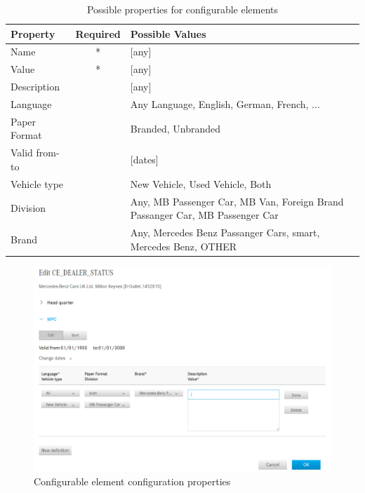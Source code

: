 \begin{table}[!ht]
  \begin{center}
    \begin{tabular}{|l|c|p{10cm}|}
      \hline
      Property & Required & Possible Values \\
      \hline\hline
      Name & * & [any] \\
      \hline
      Value & * & [any] \\
      \hline
      Description & & [any] \\
      \hline
      Language & & Any Language, English, German, French, ... \\
      \hline
      Paper Format & & Branded, Unbranded \\
      \hline
      Valid from-to & & [dates] \\
      \hline
      Vehicle type & & New Vehicle, Used Vehicle, Both \\
      \hline
      Division & & Any, MB Passenger Car, MB Van, Foreign Brand Passanger Car, MB Passenger Car \\
      \hline
      Brand & & Any, Mercedes Benz Passanger Cars, smart, Mercedes Benz, OTHER \\
      \hline
    \end{tabular}
  \end{center}
  \caption{Possible properties for configurable elements}
  \label{table:ce-properties}
\end{table}

\begin{figure}
  \centering
  \includegraphics[width=0.8\linewidth]{assets/pos-ce-config-4.png}
  \caption{Configurable element configuration properties}
  \label{fig:ce-properties}
\end{figure}

